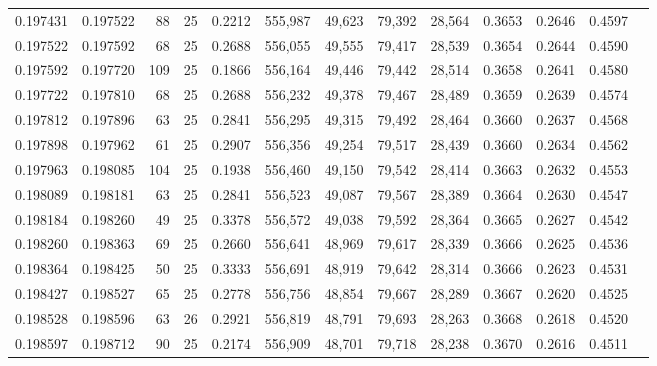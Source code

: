 \begin{tabular}{rrrrrrrrrrrrr}
0.197431 & 0.197522 &    88 &  25 &                                     0.2212 & 555,987 &  49,623 &  79,392 &  28,564 & 0.3653 & 0.2646 & 0.4597 \\
0.197522 & 0.197592 &    68 &  25 &                                     0.2688 & 556,055 &  49,555 &  79,417 &  28,539 & 0.3654 & 0.2644 & 0.4590 \\
0.197592 & 0.197720 &   109 &  25 &                                     0.1866 & 556,164 &  49,446 &  79,442 &  28,514 & 0.3658 & 0.2641 & 0.4580 \\
0.197722 & 0.197810 &    68 &  25 &                                     0.2688 & 556,232 &  49,378 &  79,467 &  28,489 & 0.3659 & 0.2639 & 0.4574 \\
0.197812 & 0.197896 &    63 &  25 &                                     0.2841 & 556,295 &  49,315 &  79,492 &  28,464 & 0.3660 & 0.2637 & 0.4568 \\
0.197898 & 0.197962 &    61 &  25 &                                     0.2907 & 556,356 &  49,254 &  79,517 &  28,439 & 0.3660 & 0.2634 & 0.4562 \\
0.197963 & 0.198085 &   104 &  25 &                                     0.1938 & 556,460 &  49,150 &  79,542 &  28,414 & 0.3663 & 0.2632 & 0.4553 \\
0.198089 & 0.198181 &    63 &  25 &                                     0.2841 & 556,523 &  49,087 &  79,567 &  28,389 & 0.3664 & 0.2630 & 0.4547 \\
0.198184 & 0.198260 &    49 &  25 &                                     0.3378 & 556,572 &  49,038 &  79,592 &  28,364 & 0.3665 & 0.2627 & 0.4542 \\
0.198260 & 0.198363 &    69 &  25 &                                     0.2660 & 556,641 &  48,969 &  79,617 &  28,339 & 0.3666 & 0.2625 & 0.4536 \\
0.198364 & 0.198425 &    50 &  25 &                                     0.3333 & 556,691 &  48,919 &  79,642 &  28,314 & 0.3666 & 0.2623 & 0.4531 \\
0.198427 & 0.198527 &    65 &  25 &                                     0.2778 & 556,756 &  48,854 &  79,667 &  28,289 & 0.3667 & 0.2620 & 0.4525 \\
0.198528 & 0.198596 &    63 &  26 &                                     0.2921 & 556,819 &  48,791 &  79,693 &  28,263 & 0.3668 & 0.2618 & 0.4520 \\
0.198597 & 0.198712 &    90 &  25 &                                     0.2174 & 556,909 &  48,701 &  79,718 &  28,238 & 0.3670 & 0.2616 & 0.4511 \\

\end{tabular}
